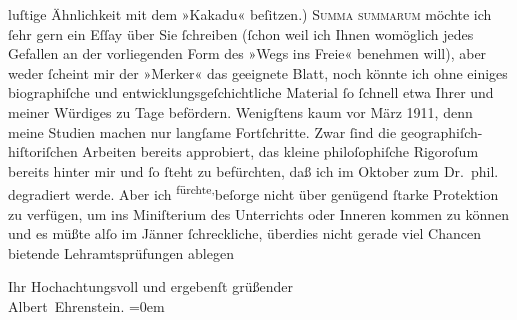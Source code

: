           luſtige Ähnlichkeit mit dem »Kakadu« beſitzen.) \textsc{Summa summarum} möchte ich{ }ſehr gern ein Eſſay über Sie{ }ſchreiben
          (ſchon weil ich Ihnen womöglich jedes Gefallen an der vorliegenden Form des »Wegs ins Freie« benehmen will), aber weder{ }ſcheint mir
            {\pb}der »Merker« das geeignete Blatt, noch könnte ich ohne einiges biographiſche und
          entwicklungsgeſchichtliche Material{ }ſo{ }ſchnell etwa Ihrer und meiner Würdiges zu Tage
          befördern. Wenigſtens kaum vor März 1911, denn meine Studien machen nur
          langſame Fortſchritte. Zwar{ }ſind die geographiſch-hiſtoriſchen Arbeiten bereits
          approbiert, das kleine philoſophiſche Rigoroſum bereits hinter mir und{ }ſo{ }ſteht zu
          befürchten, daß ich im Oktober zum Dr. phil. degradiert werde. Aber ich \substVorne{}\textsuperscript{fürchte,}\substDazwischen{}beſorge\substHinten{} nicht über genügend{ }ſtarke Protektion zu verfügen, um ins Miniſterium des Unterrichts oder Inneren kommen zu können und es müßte alſo im Jänner{ }ſchreckliche, überdies nicht gerade viel Chancen
          bietende Lehramtsprüfungen ablegen\pend
           
\pstart
           Ihr Hochachtungsvoll und ergebenſt grüßender{\\[\baselineskip]}\spacefill\mbox{Albert Ehrenstein.}\pend
           \leftskip=0em{}\endnumbering{}  \newcommand{\dateiname}{L01946}\newcommand{\titel}{Albert Ehrenstein an Arthur Schnitzler, 12. 7. 1910}\newcommand{\editorInnen}{Martin Anton Müller und Gerd-Hermann Susen}
